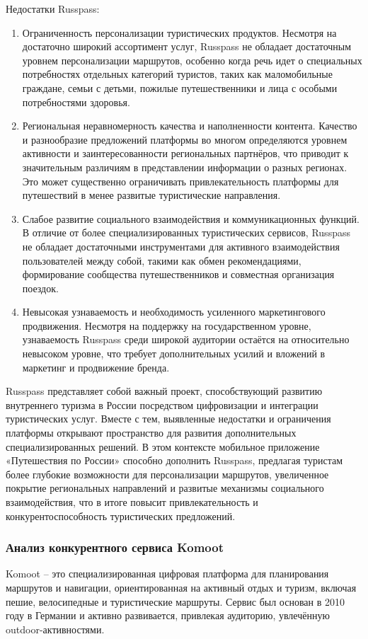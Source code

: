 Недостатки Russpass:
\begin{enumerate}
    \item Ограниченность персонализации туристических продуктов. Несмотря на достаточно широкий ассортимент услуг, Russpass не обладает достаточным уровнем персонализации маршрутов, особенно когда речь идет о специальных потребностях отдельных категорий туристов, таких как маломобильные граждане, семьи с детьми, пожилые путешественники и лица с особыми потребностями здоровья.
    \item Региональная неравномерность качества и наполненности контента. Качество и разнообразие предложений платформы во многом определяются уровнем активности и заинтересованности региональных партнёров, что приводит к значительным различиям в представлении информации о разных регионах. Это может существенно ограничивать привлекательность платформы для путешествий в менее развитые туристические направления.
    \item Слабое развитие социального взаимодействия и коммуникационных функций. В отличие от более специализированных туристических сервисов, Russpass не обладает достаточными инструментами для активного взаимодействия пользователей между собой, такими как обмен рекомендациями, формирование сообщества путешественников и совместная организация поездок.
    \item Невысокая узнаваемость и необходимость усиленного маркетингового продвижения. Несмотря на поддержку на государственном уровне, узнаваемость Russpass среди широкой аудитории остаётся на относительно невысоком уровне, что требует дополнительных усилий и вложений в маркетинг и продвижение бренда.
\end{enumerate}

Russpass представляет собой важный проект, способствующий развитию внутреннего туризма в России посредством цифровизации и интеграции туристических услуг. Вместе с тем, выявленные недостатки и ограничения платформы открывают пространство для развития дополнительных специализированных решений. В этом контексте мобильное приложение «Путешествия по России» способно дополнить Russpass, предлагая туристам более глубокие возможности для персонализации маршрутов, увеличенное покрытие региональных направлений и развитые механизмы социального взаимодействия, что в итоге повысит привлекательность и конкурентоспособность туристических предложений.

\subsubsection*{Анализ конкурентного сервиса Komoot}
Komoot – это специализированная цифровая платформа для планирования маршрутов и навигации, ориентированная на активный отдых и туризм, включая пешие, велосипедные и туристические маршруты. Сервис был основан в 2010 году в Германии и активно развивается, привлекая аудиторию, увлечённую outdoor-активностями.

